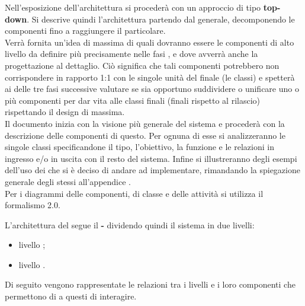 Nell'esposizione dell'architettura si procederà con un approccio di tipo \textbf{top-down}. Si descrive quindi l’architettura partendo dal generale, decomponendo le componenti fino a raggiungere il particolare.\\
Verrà fornita un'idea di massima di quali dovranno essere le componenti di alto livello da definire più precisamente nelle fasi ,  e  dove avverrà anche la progettazione al dettaglio. Ciò significa che tali componenti potrebbero non corrispondere in rapporto 1:1 con le singole unità del  finale (le classi) e spetterà ai  delle tre fasi successive valutare se sia opportuno suddividere o unificare uno o più componenti per dar vita alle classi finali (finali rispetto al rilascio) rispettando il design di massima.\\
Il documento inizia con la visione più generale del sistema e procederà con la descrizione delle componenti di questo. Per ognuna di esse si analizzeranno le singole classi specificandone il tipo, l'obiettivo, la funzione e le relazioni in ingresso e/o in uscita con il resto del sistema. Infine si illustreranno degli esempi dell'uso dei  che si è deciso di andare ad implementare, rimandando la spiegazione generale degli stessi all'appendice .\\
Per i diagrammi delle componenti, di classe e delle attività si utilizza il formalismo  2.0. 


L'architettura del  segue il  \textbf{-} dividendo quindi il sistema in due livelli:
\begin{itemize}
	\item{livello };
	\item{livello }.
\end{itemize}
Di seguito vengono rappresentate le relazioni tra i livelli e i loro componenti che permettono di a questi di interagire.


